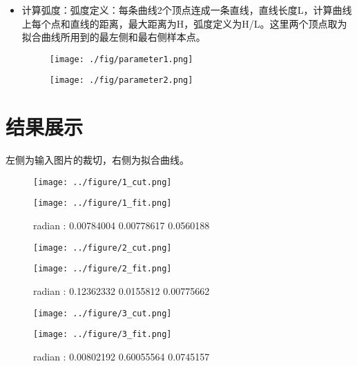 \documentclass{article}
\begin{document}
\begin{itemize}
\item
  计算弧度：弧度定义：每条曲线2个顶点连成一条直线，直线长度L，计算曲线上每个点和直线的距离，最大距离为H，弧度定义为H/L。这里两个顶点取为拟合曲线所用到的最左侧和最右侧样本点。\\
  \begin{figure}[H]
  \begin{minipage}{0.5\linewidth}
  \centerline{\texttt{[image: ./fig/parameter1.png]}}
  \end{minipage}
  \hfill
  \begin{minipage}{0.5\linewidth}
  \centerline{\texttt{[image: ./fig/parameter2.png]}}
  \end{minipage}
  \end{figure}
\end{itemize}


\section{结果展示}

左侧为输入图片的裁切，右侧为拟合曲线。

\begin{figure}[H]
\begin{minipage}{0.48\linewidth}
  \centerline{\texttt{[image: ../figure/1\_cut.png]}}
\end{minipage}
\hfill
\begin{minipage}{0.48\linewidth}
  \centerline{\texttt{[image: ../figure/1\_fit.png]}}
\end{minipage}
\caption{radian : 0.00784004 0.00778617 0.0560188 }
\end{figure}


\begin{figure}[H]
\begin{minipage}{0.48\linewidth}
  \centerline{\texttt{[image: ../figure/2\_cut.png]}}
\end{minipage}
\hfill
\begin{minipage}{0.48\linewidth}
  \centerline{\texttt{[image: ../figure/2\_fit.png]}}
\end{minipage}
\caption{radian : 0.12362332 0.0155812  0.00775662}
\end{figure}


\begin{figure}[H]
\begin{minipage}{0.48\linewidth}
  \centerline{\texttt{[image: ../figure/3\_cut.png]}}
\end{minipage}
\hfill
\begin{minipage}{0.48\linewidth}
  \centerline{\texttt{[image: ../figure/3\_fit.png]}}
\end{minipage}
\caption{radian : 0.00802192 0.60055564 0.0745157}
\end{figure}
\end{document}
